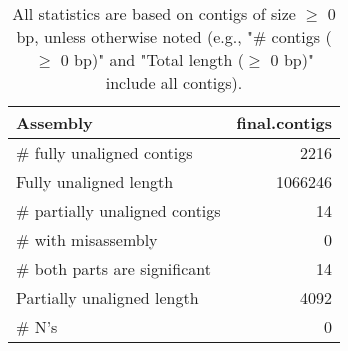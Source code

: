 \documentclass[12pt,a4paper]{article}
\begin{document}
\begin{table}[ht]
\begin{center}
\caption{All statistics are based on contigs of size $\geq$ 0 bp, unless otherwise noted (e.g., "\# contigs ($\geq$ 0 bp)" and "Total length ($\geq$ 0 bp)" include all contigs).}
\begin{tabular}{|l*{1}{|r}|}
\hline
Assembly & final.contigs \\ \hline
\# fully unaligned contigs & 2216 \\ \hline
Fully unaligned length & 1066246 \\ \hline
\# partially unaligned contigs & 14 \\ \hline
\hspace{5mm}\# with misassembly & 0 \\ \hline
\hspace{5mm}\# both parts are significant & 14 \\ \hline
Partially unaligned length & 4092 \\ \hline
\# N's & 0 \\ \hline
\end{tabular}
\end{center}
\end{table}
\end{document}
